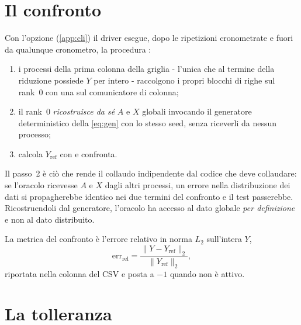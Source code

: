 \section{Il confronto}
\label{sec:oracolo-confronto}

Con l'opzione  (\cref{app:cli}) il driver esegue, dopo le
ripetizioni cronometrate e fuori da qualunque cronometro, la procedura
:

\begin{enumerate}[nosep,left=0pt]
  \item i processi della prima colonna della griglia - l'unica che al termine
        della riduzione possiede $Y$ per intero - raccolgono i propri blocchi
        di righe sul rank~0 con una  sul comunicatore di
        colonna;
  \item il rank~0 \emph{ricostruisce da sé} $A$ e $X$ globali invocando il
        generatore deterministico della \cref{eq:gen} con lo stesso seed, senza
        riceverli da nessun processo;
  \item calcola $Y_{\text{ref}}$ con  e confronta.
\end{enumerate}

Il passo~2 è ciò che rende il collaudo indipendente dal codice che deve
collaudare: se l'oracolo ricevesse $A$ e $X$ dagli altri processi, un errore
nella distribuzione dei dati si propagherebbe identico nei due termini del
confronto e il test passerebbe. Ricostruendoli dal generatore, l'oracolo ha
accesso al dato globale \emph{per definizione} e non al dato distribuito.

La metrica del confronto è l'errore relativo in norma $L_2$ sull'intera $Y$,
\begin{equation}
  \mathrm{err}_{\text{rel}}
  =
  \frac{\lVert Y - Y_{\text{ref}} \rVert_2}{\lVert Y_{\text{ref}} \rVert_2},
  \label{eq:err-rel-oracolo}
\end{equation}
riportata nella colonna  del CSV e posta a $-1$ quando
 non è attivo.

\section{La tolleranza}
\label{sec:oracolo-tolleranza}

